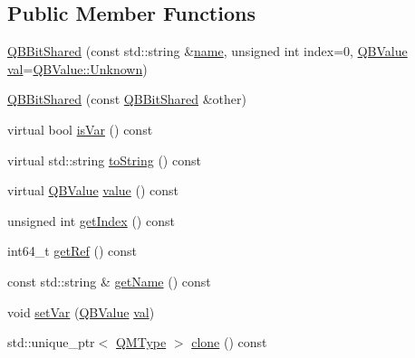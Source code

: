 \subsection*{Public Member Functions}
\begin{DoxyCompactItemize}
\item 
\hyperlink{classQuickMath_1_1QBBitShared_ad3a01433a2fe1d6689c61c0c0842d238}{Q\+B\+Bit\+Shared} (const std\+::string \&\hyperlink{classQuickMath_1_1QBBitShared_aa56ea4ce760dc0b941619974eb3ff626}{name}, unsigned int index=0, \hyperlink{namespaceQuickMath_aec13b08c42d9f8e688241623c8b379a0}{Q\+B\+Value} \hyperlink{classQuickMath_1_1QBBitShared_ae31aef3bff69da20dbc21799840c3b55}{val}=\hyperlink{namespaceQuickMath_aec13b08c42d9f8e688241623c8b379a0a88183b946cc5f0e8c96b2e66e1c74a7e}{Q\+B\+Value\+::\+Unknown})
\item 
\hyperlink{classQuickMath_1_1QBBitShared_ae6f5b0b474a37cd4ce4615d160713ac6}{Q\+B\+Bit\+Shared} (const \hyperlink{classQuickMath_1_1QBBitShared}{Q\+B\+Bit\+Shared} \&other)
\item 
virtual bool \hyperlink{classQuickMath_1_1QBBitShared_a69af2dec5fd73109c43f22c4230aa359}{is\+Var} () const 
\item 
virtual std\+::string \hyperlink{classQuickMath_1_1QBBitShared_ab1b3be4ae9548eac373e17038393f8a5}{to\+String} () const 
\item 
virtual \hyperlink{namespaceQuickMath_aec13b08c42d9f8e688241623c8b379a0}{Q\+B\+Value} \hyperlink{classQuickMath_1_1QBBitShared_a27cbff4bed10a2e1f0f958f07d2f3485}{value} () const 
\item 
unsigned int \hyperlink{classQuickMath_1_1QBBitShared_a98fb49161971cc3d78d2985fb94880b9}{get\+Index} () const 
\item 
int64\+\_\+t \hyperlink{classQuickMath_1_1QBBitShared_a158d2c15f27b1b5e2d25757a497bf178}{get\+Ref} () const 
\item 
const std\+::string \& \hyperlink{classQuickMath_1_1QBBitShared_adb5a57410ff5faf4add199a8ca7153be}{get\+Name} () const 
\item 
void \hyperlink{classQuickMath_1_1QBBitShared_a97bc55fd78add03023d69806b4df7723}{set\+Var} (\hyperlink{namespaceQuickMath_aec13b08c42d9f8e688241623c8b379a0}{Q\+B\+Value} \hyperlink{classQuickMath_1_1QBBitShared_ae31aef3bff69da20dbc21799840c3b55}{val})
\item 
std\+::unique\+\_\+ptr$<$ \hyperlink{classQuickMath_1_1QMType}{Q\+M\+Type} $>$ \hyperlink{classQuickMath_1_1QBBitShared_a8664352f6b5fa48070ffc4fa237a394e}{clone} () const 
\end{DoxyCompactItemize}
